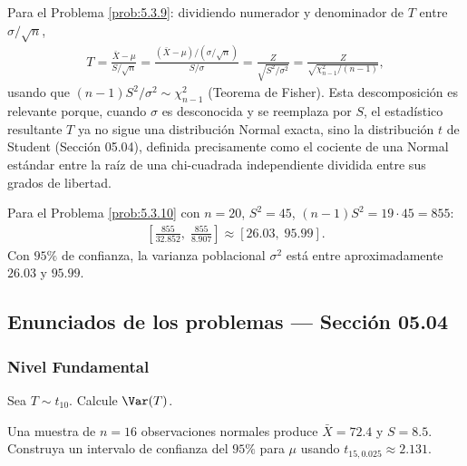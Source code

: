 \begin{solucion}
	\label{sol:5.3.9}
	Para el Problema \ref{prob:5.3.9}: dividiendo numerador y denominador de $T$ entre $\sigma/\sqrt n$,
	\begin{align*}
		T = \frac{\bar X-\mu}{S/\sqrt n} = \frac{(\bar X-\mu)/(\sigma/\sqrt n)}{S/\sigma} = \frac{Z}{\sqrt{S^2/\sigma^2}} = \frac{Z}{\sqrt{\chi^2_{n-1}/(n-1)}},
	\end{align*}
	usando que $(n-1)S^2/\sigma^2\sim\chi^2_{n-1}$ (Teorema de Fisher). Esta descomposición es relevante porque, cuando $\sigma$ es desconocida y se reemplaza por $S$, el estadístico resultante $T$ ya no sigue una distribución Normal exacta, sino la distribución $t$ de Student (Sección 05.04), definida precisamente como el cociente de una Normal estándar entre la raíz de una chi-cuadrada independiente dividida entre sus grados de libertad. \quad \qedhere
\end{solucion}

\begin{solucion}
	\label{sol:5.3.10}
	Para el Problema \ref{prob:5.3.10} con $n=20$, $S^2=45$, $(n-1)S^2 = 19\cdot 45 = 855$:
	\begin{align*}
		\left[\frac{855}{32.852},\; \frac{855}{8.907}\right] \approx [26.03,\; 95.99].
	\end{align*}
	Con $95\%$ de confianza, la varianza poblacional $\sigma^2$ está entre aproximadamente $26.03$ y $95.99$. \quad \qedhere
\end{solucion}


\subsection*{Enunciados de los problemas --- Sección 05.04}

\subsubsection*{Nivel Fundamental}

\begin{problema}
	\label{prob:5.4.1}
	Sea $T \sim t_{10}$. Calcule $\Var(T)$.
\end{problema}

\begin{problema}
	\label{prob:5.4.2}
	Una muestra de $n=16$ observaciones normales produce $\bar X=72.4$ y $S=8.5$. Construya un intervalo de confianza del $95\%$ para $\mu$ usando $t_{15,0.025}\approx 2.131$.
\end{problema}


